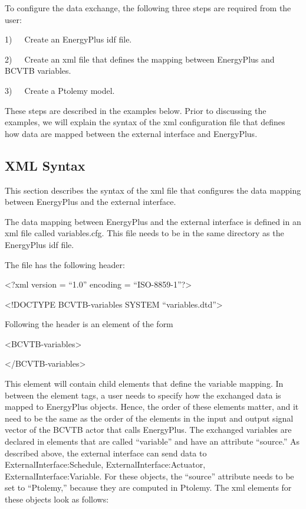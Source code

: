 To configure the data exchange, the following three steps are required from the user:

1)~~~Create an EnergyPlus idf file.

2)~~~Create an xml file that defines the mapping between EnergyPlus and BCVTB variables.

3)~~~Create a Ptolemy model.

These steps are described in the examples below. Prior to discussing the examples, we will explain the syntax of the xml configuration file that defines how data are mapped between the external interface and EnergyPlus.

\subsection{XML Syntax}\label{xml-syntax}

This section describes the syntax of the xml file that configures the data mapping between EnergyPlus and the external interface.

The data mapping between EnergyPlus and the external interface is defined in an xml file called variables.cfg. This file needs to be in the same directory as the EnergyPlus idf file.

The file has the following header:

\textless{}?xml version = ``1.0'' encoding = ``ISO-8859-1''?\textgreater{}

\textless{}!DOCTYPE BCVTB-variables SYSTEM ``variables.dtd''\textgreater{}

Following the header is an element of the form

\textless{}BCVTB-variables\textgreater{}

\textless{}/BCVTB-variables\textgreater{}

This element will contain child elements that define the variable mapping. In between the element tags, a user needs to specify how the exchanged data is mapped to EnergyPlus objects. Hence, the order of these elements matter, and it need to be the same as the order of the elements in the input and output signal vector of the BCVTB actor that calls EnergyPlus. The exchanged variables are declared in elements that are called ``variable'' and have an attribute ``source.'' As described above, the external interface can send data to ExternalInterface:Schedule, ExternalInterface:Actuator, ExternalInterface:Variable. For these objects, the ``source'' attribute needs to be set to ``Ptolemy,'' because they are computed in Ptolemy. The xml elements for these objects look as follows:

